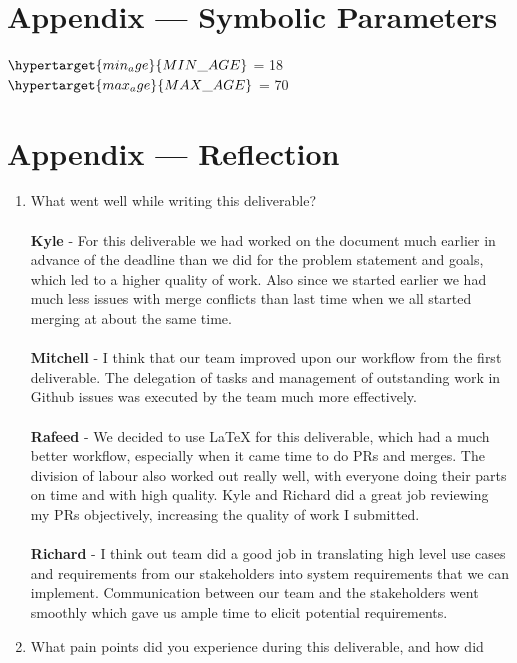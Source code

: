\documentclass[12pt]{article}
\begin{document}
\newpage{}
\section*{Appendix --- Symbolic Parameters}
$\hypertarget{min_age}{MIN\_AGE}$ = 18\\
$\hypertarget{max_age}{MAX\_AGE}$ = 70\\

\section*{Appendix --- Reflection}

\begin{enumerate}
  \item What went well while writing this deliverable? \\
    \\
    \textbf{Kyle} - For this deliverable we had worked on the
    document much earlier in advance of the deadline than we did for
    the problem statement and goals, which led to a higher quality of
    work. Also since we started earlier we had much less issues with
    merge conflicts than last time when we all started merging at
    about the same time.\\
    \\
    \textbf{Mitchell} - I think that our team improved upon our
    workflow from the first deliverable. The delegation of tasks and
    management of outstanding work in Github issues was executed by
    the team much more effectively.\\
    \\
    \textbf{Rafeed} - We decided to use LaTeX for this deliverable,
    which had a much better workflow, especially when it came time to
    do PRs and merges. The division of labour also worked out really
    well, with everyone doing their parts on time and with high
    quality. Kyle and Richard did a great job reviewing my PRs
    objectively, increasing the quality of work I submitted. \\
    \\
    \textbf{Richard} - I think out team did a good job in translating high level
    use cases and requirements from our stakeholders into system requirements
    that we can implement. Communication between our team and the stakeholders
    went smoothly which gave us ample time to elicit potential requirements.\\
  \item What pain points did you experience during this deliverable, and how did

\end{enumerate}
\end{document}
